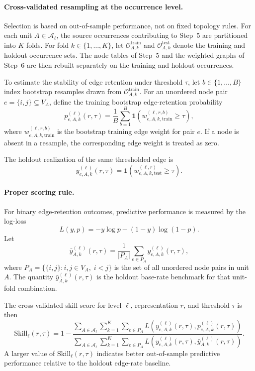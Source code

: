 \paragraph{Cross-validated resampling at the occurrence level.}
Selection is based on out-of-sample performance, not on fixed topology rules. For each unit
\(A \in \mathcal{A}_{\ell}\), the source occurrences contributing to Step~5 are partitioned into
\(K\) folds. For fold \(k \in \{1,\dots,K\}\), let
\(\mathcal{O}^{\mathrm{train}}_{A,k}\) and \(\mathcal{O}^{\mathrm{test}}_{A,k}\) denote the
training and holdout occurrence sets. The node tables of Step~5 and the weighted graphs of
Step~6 are then rebuilt separately on the training and holdout occurrences.

To estimate the stability of edge retention under threshold \(\tau\), let
\(b \in \{1,\dots,B\}\) index bootstrap resamples drawn from
\(\mathcal{O}^{\mathrm{train}}_{A,k}\). For an unordered node pair
\(e=\{i,j\}\subseteq V_A\), define the training bootstrap edge-retention probability
\[
p^{(\ell)}_{e,A,k}(r,\tau)
=
\frac{1}{B}
\sum_{b=1}^{B}
\mathbf{1}
\!\left(
w^{(\ell,r,b)}_{e,A,k,\mathrm{train}} \ge \tau
\right),
\]
where \(w^{(\ell,r,b)}_{e,A,k,\mathrm{train}}\) is the bootstrap training edge weight for pair
\(e\). If a node is absent in a resample, the corresponding edge weight is treated as zero.

The holdout realization of the same thresholded edge is
\[
y^{(\ell)}_{e,A,k}(r,\tau)
=
\mathbf{1}
\!\left(
w^{(\ell,r)}_{e,A,k,\mathrm{test}} \ge \tau
\right).
\]

\paragraph{Proper scoring rule.}
For binary edge-retention outcomes, predictive performance is measured by the log-loss
\[
L(y,p)
=
-y\log p - (1-y)\log(1-p).
\]
Let
\[
\bar y^{(\ell)}_{A,k}(r,\tau)
=
\frac{1}{|P_A|}
\sum_{e \in P_A}
y^{(\ell)}_{e,A,k}(r,\tau),
\]
where \(P_A=\{\{i,j\}: i,j \in V_A,\; i<j\}\) is the set of all unordered node pairs in unit \(A\).
The quantity \(\bar y^{(\ell)}_{A,k}(r,\tau)\) is the holdout base-rate benchmark for that
unit-fold combination.

The cross-validated skill score for level \(\ell\), representation \(r\), and threshold \(\tau\)
is then
\[
\mathrm{Skill}_{\ell}(r,\tau)
=
1
-
\frac{
\sum\limits_{A \in \mathcal{A}_{\ell}}
\sum\limits_{k=1}^{K}
\sum\limits_{e \in P_A}
L\!\left(
y^{(\ell)}_{e,A,k}(r,\tau),
p^{(\ell)}_{e,A,k}(r,\tau)
\right)
}{
\sum\limits_{A \in \mathcal{A}_{\ell}}
\sum\limits_{k=1}^{K}
\sum\limits_{e \in P_A}
L\!\left(
y^{(\ell)}_{e,A,k}(r,\tau),
\bar y^{(\ell)}_{A,k}(r,\tau)
\right)
}.
\]
A larger value of \(\mathrm{Skill}_{\ell}(r,\tau)\) indicates better out-of-sample predictive
performance relative to the holdout edge-rate baseline.

